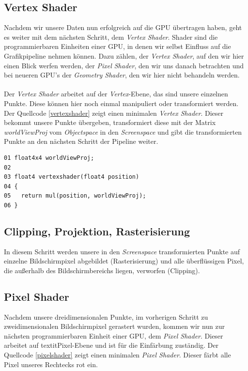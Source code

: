 \begin{Spacing}{\mylinespace}
\subsection{Vertex Shader}
Nachdem wir unsere Daten nun erfolgreich auf die GPU übertragen haben, geht es weiter mit dem nächsten Schritt, dem \textit{Vertex Shader}. Shader sind die programmierbaren Einheiten einer GPU, in denen wir selbst Einfluss auf die Grafikpipeline nehmen können. Dazu zählen, der \textit{Vertex Shader}, auf den wir hier einen Blick werfen werden, der \textit{Pixel Shader}, den wir uns danach betrachten und bei neueren GPU's der \textit{Geometry Shader}, den wir hier nicht behandeln werden.
\\\\
Der \textit{Vertex Shader} arbeitet auf der \textit{Vertex}-Ebene, das sind unsere einzelnen Punkte. Diese können hier noch einmal manipuliert oder transformiert werden.
Der Quellcode \ref{vertexshader} zeigt einen minimalen \textit{Vertex Shader}. Dieser bekommt unsere Punkte übergeben, transformiert diese mit der Matrix \textit{worldViewProj} vom \textit{Objectspace} in den \textit{Screenspace} und gibt die transformierten Punkte an den nächsten Schritt der Pipeline weiter.

\begin{lstlisting}[captionpos=b, caption=Vertex Shader unseres Rechtecks., label=vertexshader]
01 float4x4 worldViewProj;
02
03 float4 vertexshader(float4 position)
04 {
05   return mul(position, worldViewProj);		
06 }
\end{lstlisting}

\subsection{Clipping, Projektion, Rasterisierung}
In diesem Schritt werden unsere in den \textit{Screenspace} transformierten Punkte auf einzelne Bildschirmpixel abgebildet (Rasterisierung) und alle überflüssigen Pixel, die außerhalb des Bildschirmbereichs liegen, verworfen (Clipping).

\subsection{Pixel Shader}
Nachdem unsere dreidimensionalen Punkte, im vorherigen Schritt zu zweidimensionalen Bildschirmpixel gerastert wurden, kommen wir nun zur nächsten programmierbaren Einheit einer GPU, dem \textit{Pixel Shader}. Dieser arbeitet auf textit{Pixel}-Ebene und ist für die Einfärbung zuständig. Der Quellcode \ref{pixelshader} zeigt einen minimalen \textit{Pixel Shader}. Dieser färbt alle Pixel unseres Rechtecks rot ein.


\end{Spacing}
